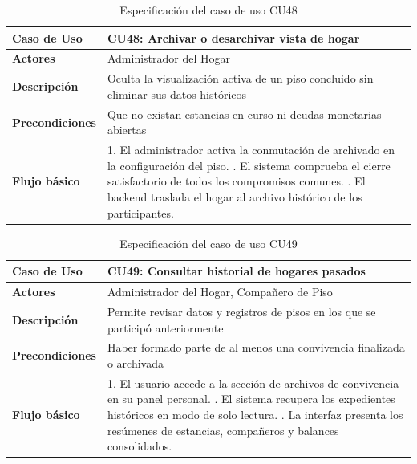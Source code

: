 \begin{table}[H]
\centering
\begin{tabular}{|p{3.2cm}|p{11.3cm}|}
\hline
\textbf{Caso de Uso} & \textbf{CU48: Archivar o desarchivar vista de hogar} \\ \hline
\textbf{Actores} & Administrador del Hogar \\ \hline
\textbf{Descripción} & Oculta la visualización activa de un piso concluido sin eliminar sus datos históricos \\ \hline
\textbf{Precondiciones} & Que no existan estancias en curso ni deudas monetarias abiertas \\ \hline
\textbf{Flujo básico} & 
1. El administrador activa la conmutación de archivado en la configuración del piso. \newline
2. El sistema comprueba el cierre satisfactorio de todos los compromisos comunes. \newline
3. El backend traslada el hogar al archivo histórico de los participantes. \\ \hline
\end{tabular}
\caption{Especificación del caso de uso CU48}
\label{tab:cu48}
\end{table}

\begin{table}[H]
\centering
\begin{tabular}{|p{3.2cm}|p{11.3cm}|}
\hline
\textbf{Caso de Uso} & \textbf{CU49: Consultar historial de hogares pasados} \\ \hline
\textbf{Actores} & Administrador del Hogar, Compañero de Piso \\ \hline
\textbf{Descripción} & Permite revisar datos y registros de pisos en los que se participó anteriormente \\ \hline
\textbf{Precondiciones} & Haber formado parte de al menos una convivencia finalizada o archivada \\ \hline
\textbf{Flujo básico} & 
1. El usuario accede a la sección de archivos de convivencia en su panel personal. \newline
2. El sistema recupera los expedientes históricos en modo de solo lectura. \newline
3. La interfaz presenta los resúmenes de estancias, compañeros y balances consolidados. \\ \hline
\end{tabular}
\caption{Especificación del caso de uso CU49}
\label{tab:cu49}
\end{table}